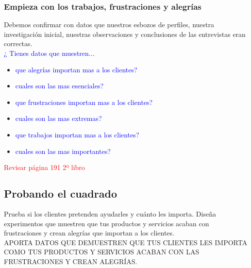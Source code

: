 \documentclass[11pt]{book}
\begin{document}
\subsubsection{Empieza con los trabajos, frustraciones y alegrías}
Debemos confirmar con datos que nuestros esbozos de perfiles, nuestra investigación inicial, nuestras observaciones y conclusiones de las entrevistas eran correctas.\\
\textcolor{blue}{¿ Tienes datos que muestren...}
\begin{itemize}
\item \textcolor{blue}{ que alegrías importan mas a los clientes? }
\item \textcolor{blue}{ cuales son las mas esenciales? }
\item \textcolor{blue}{ que frustraciones importan mas a los clientes? }
\item \textcolor{blue}{ cuales son las mas extremas? }
\item \textcolor{blue}{ que trabajos importan mas a los clientes? }
\item \textcolor{blue}{ cuales son las mas importantes? }
\end{itemize}
\textcolor{red}{ Revisar página 191 2º libro }
\subsection{Probando el cuadrado}
Prueba si los clientes pretenden ayudarles y cuánto les importa. Diseña experimentos que muestren que tus productos y servicios acaban con frustraciones y crean alegrías que importan a los clientes.\\
APORTA DATOS QUE DEMUESTREN QUE TUS CLIENTES LES IMPORTA COMO TUS PRODUCTOS Y SERVICIOS ACABAN CON LAS FRUSTRACIONES Y CREAN ALEGRÍAS.
\end{document}
